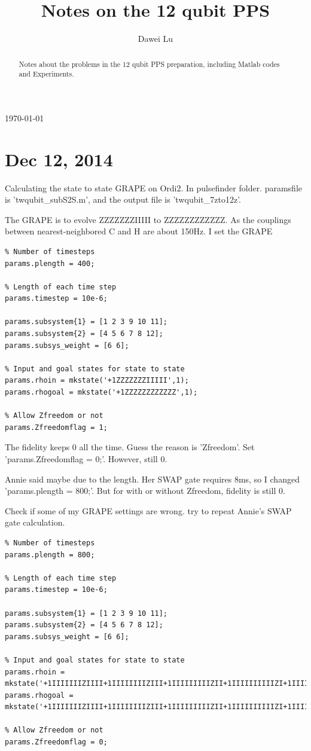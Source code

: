 \documentclass[prl,onecolumn]{revtex4-1}
\begin{document}
\title{Notes on the 12 qubit PPS}
\author{Dawei Lu}

\begin{abstract}
Notes about the problems in the 12 qubit PPS preparation, including Matlab codes and Experiments.
\end{abstract}
\today

\maketitle

\section{Dec 12, 2014}

Calculating the state to state GRAPE on Ordi2. In pulsefinder folder. paramsfile is 'twqubit\_subS2S.m', and the output file is 'twqubit\_7zto12z'.

The GRAPE is to evolve ZZZZZZZIIIII to ZZZZZZZZZZZZ. As the couplings between nearest-neighbored C and H are about 150Hz. I set the GRAPE

\begin{lstlisting}
% Number of timesteps
params.plength = 400;

% Length of each time step
params.timestep = 10e-6;

params.subsystem{1} = [1 2 3 9 10 11];
params.subsystem{2} = [4 5 6 7 8 12];
params.subsys_weight = [6 6];

% Input and goal states for state to state
params.rhoin = mkstate('+1ZZZZZZZIIIII',1);
params.rhogoal = mkstate('+1ZZZZZZZZZZZZ',1);

% Allow Zfreedom or not
params.Zfreedomflag = 1;
\end{lstlisting}

The fidelity keeps 0 all the time. Guess the reason is 'Zfreedom'. Set 'params.Zfreedomflag = 0;'. However, still 0.

Annie said maybe due to the length. Her SWAP gate requires 8ms, so I changed 'params.plength = 800;'. But for with or without Zfreedom, fidelity is still 0.

Check if some of my GRAPE settings are wrong. try to repeat Annie's SWAP gate calculation.

\begin{lstlisting}
% Number of timesteps
params.plength = 800;

% Length of each time step
params.timestep = 10e-6;

params.subsystem{1} = [1 2 3 9 10 11];
params.subsystem{2} = [4 5 6 7 8 12];
params.subsys_weight = [6 6];

% Input and goal states for state to state
params.rhoin = mkstate('+1IIIIIIIZIIII+1IIIIIIIIZIII+1IIIIIIIIIZII+1IIIIIIIIIIZI+1IIIIIIIIIIIZ',1);
params.rhogoal = mkstate('+1IIIIIIIZIIII+1IIIIIIIIZIII+1IIIIIIIIIZII+1IIIIIIIIIIZI+1IIIIIIZIIIIZ',1);

% Allow Zfreedom or not
params.Zfreedomflag = 0;
\end{lstlisting}
\end{document}
